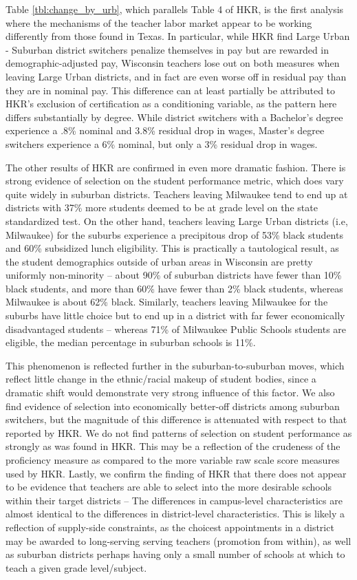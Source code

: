 \documentclass[12pt,]{article}
\begin{document}
Table \ref{tbl:change_by_urb}, which parallels Table 4 of HKR, is the
first analysis where the mechanisms of the teacher labor market appear
to be working differently from those found in Texas. In particular,
while HKR find Large Urban - Suburban district switchers penalize
themselves in pay but are rewarded in demographic-adjusted pay,
Wisconsin teachers lose out on both measures when leaving Large Urban
districts, and in fact are even worse off in residual pay than they are
in nominal pay. This difference can at least partially be attributed to
HKR's exclusion of certification as a conditioning variable, as the
pattern here differs substantially by degree. While district switchers
with a Bachelor's degree experience a .8\% nominal and 3.8\% residual
drop in wages, Master's degree switchers experience a 6\% nominal, but
only a 3\% residual drop in wages.

The other results of HKR are confirmed in even more dramatic fashion.
There is strong evidence of selection on the student performance metric,
which does vary quite widely in suburban districts. Teachers leaving
Milwaukee tend to end up at districts with 37\% more students deemed to
be at grade level on the state standardized test. On the other hand,
teachers leaving Large Urban districts (i.e, Milwaukee) for the suburbs
experience a precipitous drop of 53\% black students and 60\% subsidized
lunch eligibility. This is practically a tautological result, as the
student demographics outside of urban areas in Wisconsin are pretty
uniformly non-minority -- about 90\% of suburban districts have fewer
than 10\% black students, and more than 60\% have fewer than 2\% black
students, whereas Milwaukee is about 62\% black. Similarly, teachers
leaving Milwaukee for the suburbs have little choice but to end up in a
district with far fewer economically disadvantaged students -- whereas
71\% of Milwaukee Public Schools students are eligible, the median
percentage in suburban schools is 11\%.

This phenomenon is reflected further in the suburban-to-suburban moves,
which reflect little change in the ethnic/racial makeup of student
bodies, since a dramatic shift would demonstrate very strong influence
of this factor. We also find evidence of selection into economically
better-off districts among suburban switchers, but the magnitude of this
difference is attenuated with respect to that reported by HKR. We do not
find patterns of selection on student performance as strongly as was
found in HKR. This may be a reflection of the crudeness of the
proficiency measure as compared to the more variable raw scale score
measures used by HKR. Lastly, we confirm the finding of HKR that there
does not appear to be evidence that teachers are able to select into the
more desirable schools within their target districts -- The differences
in campus-level characteristics are almost identical to the differences
in district-level characteristics. This is likely a reflection of
supply-side constraints, as the choicest appointments in a district may
be awarded to long-serving serving teachers (promotion from within), as
well as suburban districts perhaps having only a small number of schools
at which to teach a given grade level/subject.
\end{document}
